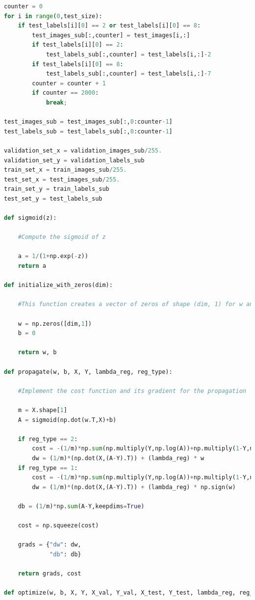 \documentclass{article} %
\begin{document}
{\begin{lstlisting}[language=Python]
counter = 0
for i in range(0,test_size):
    if test_labels[i][0] == 2 or test_labels[i][0] == 8:
        test_images_sub[:,counter] = test_images[i,:]
        if test_labels[i][0] == 2:
            test_labels_sub[:,counter] = test_labels[i,:]-2
        if test_labels[i][0] == 8:
            test_labels_sub[:,counter] = test_labels[i,:]-7
        counter = counter + 1        
        if counter == 2000:
            break;
        
test_images_sub = test_images_sub[:,0:counter-1]
test_labels_sub = test_labels_sub[:,0:counter-1]

validation_set_x = validation_images_sub/255.
validation_set_y = validation_labels_sub
train_set_x = train_images_sub/255.
test_set_x = test_images_sub/255.
train_set_y = train_labels_sub
test_set_y = test_labels_sub

def sigmoid(z):

    #Compute the sigmoid of z

    a = 1/(1+np.exp(-z))  
    return a

def initialize_with_zeros(dim):

    #This function creates a vector of zeros of shape (dim, 1) for w and initializes b to 0.

    w = np.zeros([dim,1])
    b = 0
    
    return w, b

def propagate(w, b, X, Y, lambda_reg, reg_type):
   
    #Implement the cost function and its gradient for the propagation
    
    m = X.shape[1]
    A = sigmoid(np.dot(w.T,X)+b)
    
    if reg_type == 2:
        cost = -(1/m)*np.sum(np.multiply(Y,np.log(A))+np.multiply(1-Y,np.log(1-A)),keepdims=True) + (lambda_reg/2) * np.sum(np.power(w,2)) 
        dw = (1/m)*(np.dot(X,(A-Y).T)) + (lambda_reg) * w
    if reg_type == 1:
        cost = -(1/m)*np.sum(np.multiply(Y,np.log(A))+np.multiply(1-Y,np.log(1-A)),keepdims=True) + (lambda_reg) * np.sum(np.abs(w))
        dw = (1/m)*(np.dot(X,(A-Y).T)) + (lambda_reg) * np.sign(w)
    
    db = (1/m)*np.sum(A-Y,keepdims=True)

    cost = np.squeeze(cost)
    
    grads = {"dw": dw,
             "db": db}
    
    return grads, cost

def optimize(w, b, X, Y, X_val, Y_val, X_test, Y_test, lambda_reg, reg_type, num_iterations, learning_rate, print_cost = False, early_stopping = True):


\end{lstlisting}}
\end{document}
